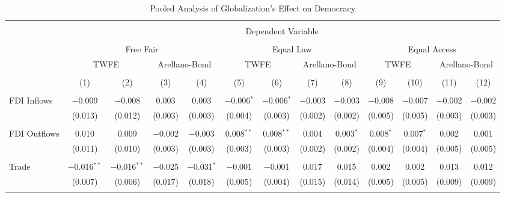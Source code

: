 
\begin{table} \centering 
  \caption{Pooled Analysis of Globalization's Effect on Democracy} 
  \label{} 
\small 
\begin{tabular}{@{\extracolsep{2pt}}lcccccccccccc} 
\\[-1.8ex]\hline 
\hline \\[-1.8ex] 
 & \multicolumn{12}{c}{Dependent Variable} \\ 
\cline{2-13} 
\\[-1.8ex] & \multicolumn{4}{c}{Free Fair} & \multicolumn{4}{c}{Equal Law} & \multicolumn{4}{c}{Equal Access} \\ 
 & \multicolumn{2}{c}{TWFE} & \multicolumn{2}{c}{Arellano-Bond} & \multicolumn{2}{c}{TWFE} & \multicolumn{2}{c}{Arellano-Bond} & \multicolumn{2}{c}{TWFE} & \multicolumn{2}{c}{Arellano-Bond} \\ 
\\[-1.8ex] & (1) & (2) & (3) & (4) & (5) & (6) & (7) & (8) & (9) & (10) & (11) & (12)\\ 
\hline \\[-1.8ex] 
 FDI Inflows & $-$0.009 & $-$0.008 & 0.003 & 0.003 & $-$0.006$^{*}$ & $-$0.006$^{*}$ & $-$0.003 & $-$0.003 & $-$0.008 & $-$0.007 & $-$0.002 & $-$0.002 \\ 
  & (0.013) & (0.012) & (0.003) & (0.003) & (0.004) & (0.003) & (0.002) & (0.002) & (0.005) & (0.005) & (0.003) & (0.003) \\ 
  & & & & & & & & & & & & \\ 
 FDI Outflows & 0.010 & 0.009 & $-$0.002 & $-$0.003 & 0.008$^{**}$ & 0.008$^{**}$ & 0.004 & 0.003$^{*}$ & 0.008$^{*}$ & 0.007$^{*}$ & 0.002 & 0.001 \\ 
  & (0.011) & (0.010) & (0.003) & (0.003) & (0.003) & (0.003) & (0.002) & (0.002) & (0.004) & (0.004) & (0.005) & (0.005) \\ 
  & & & & & & & & & & & & \\ 
 Trade & $-$0.016$^{**}$ & $-$0.016$^{**}$ & $-$0.025 & $-$0.031$^{*}$ & $-$0.001 & $-$0.001 & 0.017 & 0.015 & 0.002 & 0.002 & 0.013 & 0.012 \\ 
  & (0.007) & (0.006) & (0.017) & (0.018) & (0.005) & (0.004) & (0.015) & (0.014) & (0.005) & (0.005) & (0.009) & (0.009) \\ 
  & & & & & & & & & & & & \\ 

\end{tabular}
\end{table}
